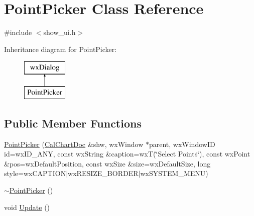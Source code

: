 \hypertarget{a00114}{\section{Point\-Picker Class Reference}
\label{a00114}
}


{\ttfamily \#include $<$show\-\_\-ui.\-h$>$}

Inheritance diagram for Point\-Picker\-:\begin{figure}[H]
\begin{center}
\leavevmode
\includegraphics[height=2.000000cm]{a00114}
\end{center}
\end{figure}
\subsection*{Public Member Functions}
\begin{DoxyCompactItemize}
\item 
\hyperlink{a00114_a88a2f5b87d78d12ccf534c7fa6bb6452}{Point\-Picker} (\hyperlink{a00020}{Cal\-Chart\-Doc} \&shw, wx\-Window $\ast$parent, wx\-Window\-I\-D id=wx\-I\-D\-\_\-\-A\-N\-Y, const wx\-String \&caption=wx\-T(\char`\"{}Select Points\char`\"{}), const wx\-Point \&pos=wx\-Default\-Position, const wx\-Size \&size=wx\-Default\-Size, long style=wx\-C\-A\-P\-T\-I\-O\-N$\vert$wx\-R\-E\-S\-I\-Z\-E\-\_\-\-B\-O\-R\-D\-E\-R$\vert$wx\-S\-Y\-S\-T\-E\-M\-\_\-\-M\-E\-N\-U)
\item 
\hyperlink{a00114_a0fc02a8d3a950e07be2df26bc2af8f9f}{$\sim$\-Point\-Picker} ()
\item 
void \hyperlink{a00114_a3bee75a513bb0de56b93e545ffb2782a}{Update} ()
\end{DoxyCompactItemize}
